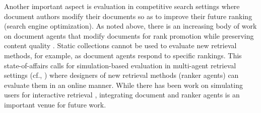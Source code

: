 Another important aspect is evaluation in competitive search settings \cite{kurland_competitive_2022} where document authors modify their documents so as to improve their future ranking (search engine optimization). As noted above, there is an increasing body of work on document agents that modify documents for rank promotion while preserving content quality \cite{Greg-bot,Niv}. Static collections cannot be used to evaluate new retrieval methods, for example, as document agents respond to specific rankings. This state-of-affairs calls for simulation-based evaluation in multi-agent retrieval settings (cf., \cite{Lemss,kurland_competitive_2022}) where designers of new retrieval methods (ranker agents) can evaluate them in an online manner. While there has been work on simulating users for interactive retrieval \cite{Balog+Zhai:24a}, integrating document and ranker agents is an important venue for future work.


